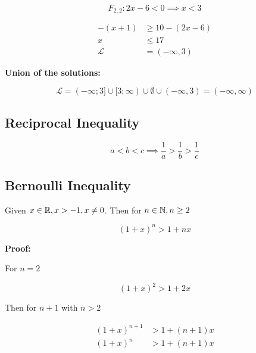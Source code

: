 \[
    F_{2,2}: 2x - 6 < 0 \implies x < 3
\]

\begin{align*}
   -(x + 1 ) &\ge 10 - (2x - 6) \\
    x &\le 17 \\
    \mathcal{L} &= (- \infty, 3)
\end{align*}

\textbf{Union of the solutions:}

\[
    \mathcal{L} = 
    (-\infty; 3] \cup 
    [3; \infty ) \cup 
    \emptyset    \cup
    (- \infty, 3) = (- \infty, \infty)
\]

\subsection{Reciprocal Inequality}

\[
    a < b < c \implies \frac{1}{a} > \frac{1}{b} > \frac{1}{c}
\]

\subsection{Bernoulli Inequality}

Given \(x \in \mathbb{R}, x > -1, x \ne 0\). Then for \(n \in \mathbb{N}, n \ge 2\)

\[
    (1 + x)^n > 1 + nx
\]

\textbf{Proof:}

For \(n = 2\)

\[
    (1 + x)^2 > 1 + 2x
\]

Then for \(n + 1\) with \(n > 2\)

\begin{align*}
    (1 + x)^{n + 1} &> 1 + (n + 1)x \\
    (1 + x)^n &> 1 + (n + 1)x
\end{align*}

\QED

